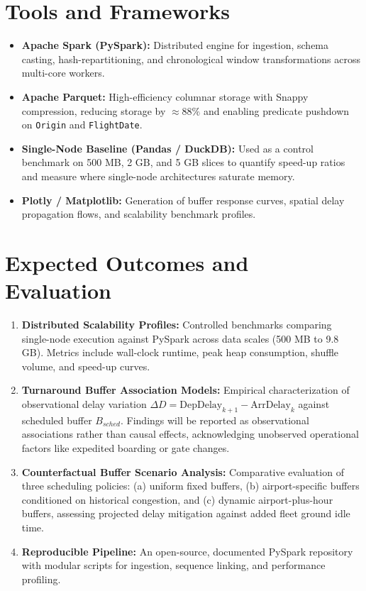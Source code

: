 \documentclass{article}
\begin{document}
\section{Tools and Frameworks}
\begin{itemize}
    \item \textbf{Apache Spark (PySpark):} Distributed engine for ingestion, schema casting, hash-repartitioning, and chronological window transformations across multi-core workers.
    \item \textbf{Apache Parquet:} High-efficiency columnar storage with Snappy compression, reducing storage by $\approx 88\%$ and enabling predicate pushdown on \texttt{Origin} and \texttt{FlightDate}.
    \item \textbf{Single-Node Baseline (Pandas / DuckDB):} Used as a control benchmark on 500 MB, 2 GB, and 5 GB slices to quantify speed-up ratios and measure where single-node architectures saturate memory.
    \item \textbf{Plotly / Matplotlib:} Generation of buffer response curves, spatial delay propagation flows, and scalability benchmark profiles.
\end{itemize}

\section{Expected Outcomes and Evaluation}
\begin{enumerate}
    \item \textbf{Distributed Scalability Profiles:} Controlled benchmarks comparing single-node execution against PySpark across data scales (500 MB to 9.8 GB). Metrics include wall-clock runtime, peak heap consumption, shuffle volume, and speed-up curves.
    \item \textbf{Turnaround Buffer Association Models:} Empirical characterization of observational delay variation $\Delta D = \text{DepDelay}_{k+1} - \text{ArrDelay}_k$ against scheduled buffer $B_{sched}$. Findings will be reported as observational associations rather than causal effects, acknowledging unobserved operational factors like expedited boarding or gate changes.
    \item \textbf{Counterfactual Buffer Scenario Analysis:} Comparative evaluation of three scheduling policies: (a) uniform fixed buffers, (b) airport-specific buffers conditioned on historical congestion, and (c) dynamic airport-plus-hour buffers, assessing projected delay mitigation against added fleet ground idle time.
    \item \textbf{Reproducible Pipeline:} An open-source, documented PySpark repository with modular scripts for ingestion, sequence linking, and performance profiling.
\end{enumerate}
\end{document}
